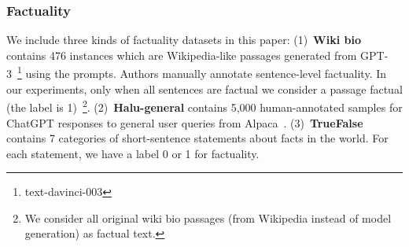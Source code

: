 \subsubsection{Factuality}
\begin{table}[t]
\small
\centering
{}
\caption{Dataset statistics for factuality.}
\label{tab:factuality_data}
\end{table}

We include three kinds of factuality datasets in this paper: (1)~\textbf{Wiki bio} contains 476 instances which are Wikipedia-like passages generated from GPT-3~\footnote{text-davinci-003} using the prompts. Authors manually annotate sentence-level factuality. In our experiments, only when all sentences are factual we consider a passage factual (the label is 1)~\footnote{We consider all original wiki bio passages (from Wikipedia instead of model generation) as factual text.}. (2)~\textbf{Halu-general} contains 5,000 human-annotated samples for ChatGPT responses to general user queries from Alpaca~\cite{alpaca}. (3)~\textbf{TrueFalse} contains 7 categories of short-sentence statements about facts in the world. For each statement, we have a label 0 or 1 for factuality.
